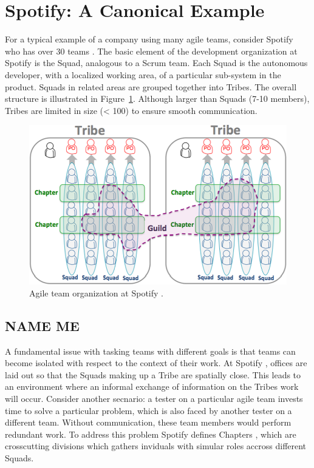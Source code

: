 ﻿\section{Spotify: A Canonical Example} 
For a typical example of a company using many agile teams, consider Spotify who has over 30 teams \cite{kniberg12}.
The basic element of the development organization at Spotify is the Squad, analogous to a Scrum team.
Each Squad is the autonomous developer, with a localized working area, of a particular sub-system in the product.
Squads in related areas are grouped together into Tribes. 
The overall structure is illustrated in Figure~\ref{fig:spotify_structure}.
Although larger than Squads (7-10 members), Tribes are limited in size (< 100) to ensure smooth communication.

\begin{figure}[h]
  \includegraphics[width=\linewidth]{images/kniberg12_structure.png}
  \caption{Agile team organization at Spotify \cite{kniberg12}.}
  \label{fig:spotify_structure}
\end{figure}


\subsection{NAME ME}
A fundamental issue with tasking teams with different goals is that teams can become isolated with respect to the context of their work.
At Spotify \cite{kniberg12}, offices are laid out so that the Squads making up a Tribe are spatially close. This leads to an environment where an informal exchange of information on the Tribes work will occur.
Consider another secnario: a tester on a particular agile team invests time to solve a particular problem, which is also faced by another tester on a different team. Without communication, these team members would perform redundant work.
To address this problem Spotify defines Chapters \cite{kniberg12}, which are crosscutting divisions which gathers inviduals with simular roles accross different Squads. 



